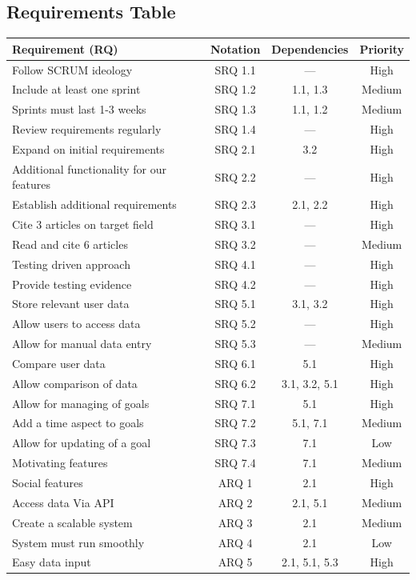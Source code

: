 \documentclass[12pt]{article}
\begin{document}
\subsection{Requirements Table} \label{sec:reqTable}
\begin{table}[!ht]
\begin{center}
\begin{tabular}{|l|c|c|c|}
    \hline 
    \textbf{Requirement (RQ)} & \textbf{Notation} & \textbf{Dependencies} & \textbf{Priority} \\ 
    \hline
    Follow SCRUM ideology & SRQ 1.1 & --- & High \\ 
    \hline
    Include at least one sprint & SRQ 1.2 & 1.1, 1.3 & Medium \\
    \hline
    Sprints must last 1-3 weeks & SRQ 1.3 & 1.1, 1.2 & Medium \\
    \hline
    Review requirements regularly & SRQ 1.4 & --- & High \\
    \hline
    Expand on initial requirements & SRQ 2.1 & 3.2 & High \\ 
    \hline
    Additional functionality for our features & SRQ 2.2 & --- & High \\
    \hline
    Establish additional requirements & SRQ 2.3 & 2.1, 2.2 & High \\ 
    \hline
    Cite 3 articles on target field & SRQ 3.1 & --- & High \\ 
    \hline
    Read and cite 6 articles & SRQ 3.2 & --- & Medium \\
    \hline
    Testing driven approach & SRQ 4.1 & --- & High \\ 
    \hline
    Provide testing evidence & SRQ 4.2 & --- & High \\
    \hline
    Store relevant user data & SRQ 5.1 & 3.1, 3.2 & High \\ 
    \hline
    Allow users to access data & SRQ 5.2 & --- & High \\ 
    \hline
    Allow for manual data entry & SRQ 5.3 & --- & Medium \\ 
    \hline
    Compare user data & SRQ 6.1 & 5.1 & High \\ 
    \hline
    Allow comparison of data & SRQ 6.2 & 3.1, 3.2, 5.1 & High \\
    \hline    
    Allow for managing of goals & SRQ 7.1 & 5.1 & High \\ 
    \hline
    Add a time aspect to goals & SRQ 7.2 & 5.1, 7.1 & Medium \\ 
    \hline
    Allow for updating of a goal & SRQ 7.3 & 7.1 & Low \\ 
    \hline
    Motivating features & SRQ 7.4 & 7.1 & Medium \\ 
    \hline
    Social features & ARQ 1 & 2.1 & High \\ 
    \hline 
    Access data Via API & ARQ 2 & 2.1, 5.1 & Medium \\
    \hline
    Create a scalable system & ARQ 3 & 2.1 & Medium \\ 
    \hline
    System must run smoothly & ARQ 4 & 2.1 & Low \\ 
    \hline
    Easy data input & ARQ 5 & 2.1, 5.1, 5.3 & High \\
    \hline


\end{tabular}
\end{center}
\end{table}
\end{document}
